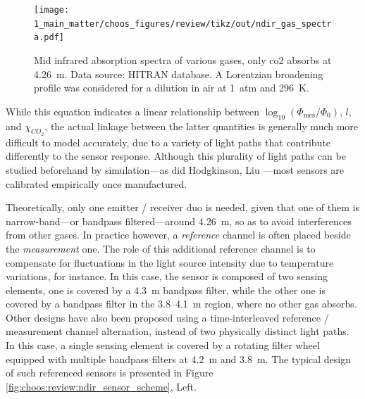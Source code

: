\begin{figure}
	\centering
	\texttt{[image: 1\_main\_matter/choos\_figures/review/tikz/out/ndir\_gas\_spectra.pdf]}
	\caption[Mid infrared absorption spectra of various gases.]{Mid infrared absorption spectra of various gases, only \gls{co2} absorbs at 4.26~\textmu{}m. Data source: HITRAN database\cite{hitran2017}. A Lorentzian broadening profile was considered for a dilution in air at 1~atm and 296~K.}
	\label{fig:choos:review:ndir_gas_spectra}
\end{figure}

While this equation indicates a linear relationship between $\log_{10}(\Phi_\mathrm{mes}/\Phi_{0})$, $l$, and $\chi_{CO_2}$, the actual linkage between the latter quantities is generally much more difficult to model accurately, due to a variety of light paths that contribute differently to the sensor response. Although this plurality of light paths can be studied beforehand by simulation---as did Hodgkinson, Liu \etal{}\cite{hodgkinson2012, hodgkinson2013, liu2016}---most sensors are calibrated empirically once manufactured.

Theoretically, only one emitter / receiver duo is needed, given that one of them is narrow-band---or bandpass filtered---around 4.26~\textmu{}m, so as to avoid interferences from other gases. In practice however, a \emph{reference} channel is often placed beside the \emph{measurement} one\cite{popa2019, zhang2010, jing2020}. The role of this additional reference channel is to compensate for fluctuations in the light source intensity due to temperature variations, for instance. In this case, the sensor is composed of two sensing elements, one is covered by a 4.3~\textmu{}m bandpass filter, while the other one is covered by a bandpass filter in the 3.8--4.1~\textmu{}m region, where no other gas absorbs. Other designs have also been proposed using a time-interleaved reference / measurement channel alternation, instead of two physically distinct light paths. In this case, a single sensing element is covered by a rotating filter wheel equipped with multiple bandpass filters at 4.2~\textmu{}m and 3.8~\textmu{}m\cite{kohsiek1991}. The typical design of such referenced sensors is presented in Figure \ref{fig:choos:review:ndir_sensor_scheme}, Left.

